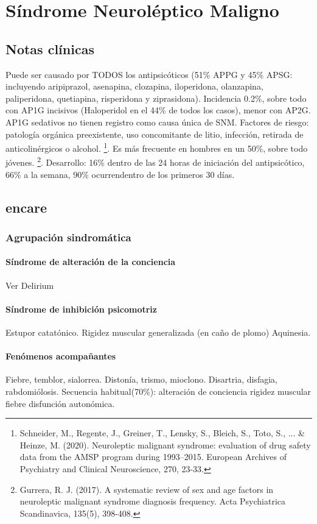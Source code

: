 \chapter{Síndrome Neuroléptico Maligno}
\section*{Notas clínicas}
Puede ser causado por TODOS los antipsicóticos (51\% APPG y 45\% APSG: incluyendo aripiprazol, asenapina, clozapina, iloperidona, olanzapina, paliperidona, quetiapina, risperidona y ziprasidona). Incidencia 0.2\%, sobre todo con AP1G incisivos (Haloperidol en el 44\% de todos los casos), menor con AP2G. AP1G sedativos no tienen registro como causa única de SNM. 
Factores de riesgo: patología orgánica preexistente, uso concomitante de litio, infección, retirada de anticolinérgicos o alcohol. \footnote{Schneider, M., Regente, J., Greiner, T., Lensky, S., Bleich, S., Toto, S., ... \& Heinze, M. (2020). Neuroleptic malignant syndrome: evaluation of drug safety data from the AMSP program during 1993–2015. European Archives of Psychiatry and Clinical Neuroscience, 270, 23-33.}. Es más frecuente en hombres en un 50\%, sobre todo jóvenes. \footnote{Gurrera, R. J. (2017). A systematic review of sex and age factors in neuroleptic malignant syndrome diagnosis frequency. Acta Psychiatrica Scandinavica, 135(5), 398-408.}. 
Desarrollo: 16\% dentro de las 24 horas de iniciación del antipsicótico, 66\% a la semana, 90\% ocurrendentro de los primeros 30 días.
\section*{encare}
\subsection*{Agrupación sindromática}
\subsubsection*{Síndrome de alteración de la conciencia}
Ver Delirium
\subsubsection*{Síndrome de inhibición psicomotriz}
Estupor catatónico.
Rigidez muscular generalizada (en caño de plomo)
Aquinesia.
\subsubsection*{Fenómenos acompañantes}
Fiebre, temblor, sialorrea. Distonía, trismo, mioclono. Disartria, disfagia, rabdomiólosis.
Secuencia habitual(70\%): alteración de conciencia \faArrowRight rigidez muscular \faArrowRight fiebre \faArrowRight disfunción autonómica.

